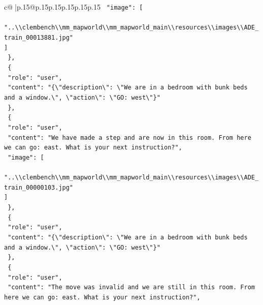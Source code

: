 \documentclass{article}
\begin{document}
{\begin{supertabular}{c@{$\;$}|p{.15\linewidth}@{}p{.15\linewidth}p{.15\linewidth}p{.15\linewidth}p{.15\linewidth}p{.15\linewidth}}
{{{\texttt{    "image": {[}} \\
\texttt{      "..\textbackslash{}\textbackslash{}clembench\textbackslash{}\textbackslash{}mm\_mapworld\textbackslash{}\textbackslash{}mm\_mapworld\_main\textbackslash{}\textbackslash{}resources\textbackslash{}\textbackslash{}images\textbackslash{}\textbackslash{}ADE\_train\_00013881.jpg"} \\
\texttt{    {]}} \\
\texttt{  \},} \\
\texttt{  \{} \\
\texttt{    "role": "user",} \\
\texttt{    "content": "\{\textbackslash{}"description\textbackslash{}": \textbackslash{}"We are in a bedroom with bunk beds and a window.\textbackslash{}", \textbackslash{}"action\textbackslash{}": \textbackslash{}"GO: west\textbackslash{}"\}"} \\
\texttt{  \},} \\
\texttt{  \{} \\
\texttt{    "role": "user",} \\
\texttt{    "content": "We have made a step and are now in this room. From here we can go: east. What is your next instruction?",} \\
\texttt{    "image": {[}} \\
\texttt{      "..\textbackslash{}\textbackslash{}clembench\textbackslash{}\textbackslash{}mm\_mapworld\textbackslash{}\textbackslash{}mm\_mapworld\_main\textbackslash{}\textbackslash{}resources\textbackslash{}\textbackslash{}images\textbackslash{}\textbackslash{}ADE\_train\_00000103.jpg"} \\
\texttt{    {]}} \\
\texttt{  \},} \\
\texttt{  \{} \\
\texttt{    "role": "user",} \\
\texttt{    "content": "\{\textbackslash{}"description\textbackslash{}": \textbackslash{}"We are in a bedroom with bunk beds and a window.\textbackslash{}", \textbackslash{}"action\textbackslash{}": \textbackslash{}"GO: west\textbackslash{}"\}"} \\
\texttt{  \},} \\
\texttt{  \{} \\
\texttt{    "role": "user",} \\
\texttt{    "content": "The move was invalid and we are still in this room. From here we can go: east. What is your next instruction?",} \\
}}}
\end{supertabular}}
\end{document}
